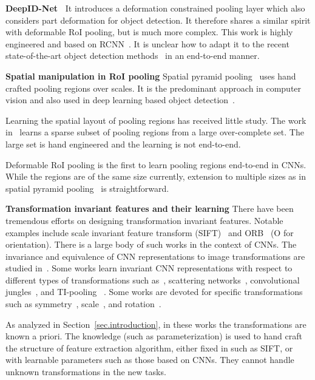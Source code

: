 \documentclass[10pt,twocolumn,letterpaper]{article}
\begin{document}
\textbf{DeepID-Net~\cite{ouyang2015deepid}} It introduces a deformation constrained pooling layer which also considers part deformation for object detection. It therefore shares a similar spirit with deformable RoI pooling, but is much more complex. This work is highly engineered and based on RCNN~\cite{girshick2014rich}. It is unclear how to adapt it to the recent state-of-the-art object detection methods~\cite{ren2015faster,dai2016rfcn} in an end-to-end manner.

\textbf{Spatial manipulation in RoI pooling} Spatial pyramid pooling~\cite{lazebnik2006beyond} uses hand crafted pooling regions over scales. It is the predominant approach in computer vision and also used in deep learning based object detection~\cite{he2014spatial,girshick2015fast}.

Learning the spatial layout of pooling regions has received little study. The work in~\cite{jia2012beyond} learns a sparse subset of pooling regions from a large over-complete set. The large set is hand engineered and the learning is not end-to-end.

Deformable RoI pooling is the first to learn pooling regions end-to-end in CNNs. While the regions are of the same size currently, extension to multiple sizes as in spatial pyramid pooling~\cite{lazebnik2006beyond} is straightforward.

\textbf{Transformation invariant features and their learning} There have been tremendous efforts on designing transformation invariant features. Notable examples include scale invariant feature transform (SIFT)~\cite{lowe1999object} and ORB~\cite{rublee2011orb} (O for orientation). There is a large body of such works in the context of CNNs. The invariance and equivalence of CNN representations to image transformations are studied in~\cite{lenc2015understanding}. Some works learn invariant CNN representations with respect to different types of transformations such as~\cite{sohn2012invariant}, scattering networks~\cite{bruna2013scattering}, convolutional jungles~\cite{laptev2015transformation}, and TI-pooling ~\cite{laptev2016tipooling}. Some works are devoted for specific transformations such as symmetry~\cite{gens2014deepsymmetry,dieleman2016cyclic}, scale~\cite{kanazawa2014scale}, and rotation~\cite{worrall2016harmonic}.

As analyzed in Section~\ref{sec.introduction}, in these works the transformations are known a priori. The knowledge (such as parameterization) is used to hand craft the structure of feature extraction algorithm, either fixed in such as SIFT, or with learnable parameters such as those based on CNNs. They cannot handle unknown transformations in the new tasks.
\end{document}
